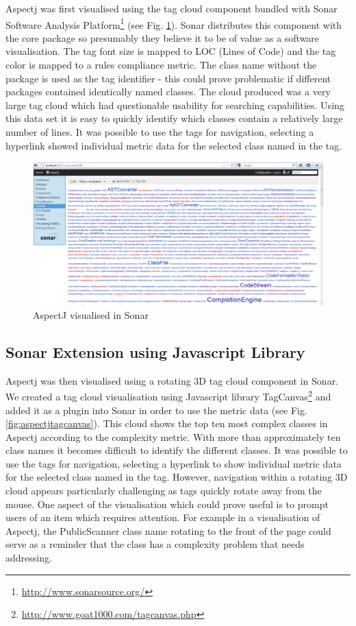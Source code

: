 Aspectj was first visualised using the tag cloud component bundled with Sonar Software Analysis Platform\footnote{\url{http://www.sonarsource.org/}} (see Fig. \ref{fig:aspectjsonar}). Sonar distributes this component with the core package so presumably they believe it to be of value as a software visualisation. The tag font size is mapped to LOC (Lines of Code) and the tag color is mapped to a rules compliance metric. The class name without the package is used as the tag identifier - this could prove problematic if different packages contained identically named classes. The cloud produced was a very large tag cloud which had questionable usability for searching capabilities. Using this data set it is easy to quickly identify which classes contain a relatively large number of lines. It was possible to use the tags for navigation, selecting a hyperlink showed individual metric data for the selected class named in the tag.

\begin{figure}[h!]
   \centering
   \includegraphics[width=140mm]{sonarcloud.png}
  \caption{AspectJ visualised in Sonar}
  \label{fig:aspectjsonar}
\end{figure}

\subsection{Sonar Extension using Javascript Library}

Aspectj was then visualised using a rotating 3D tag cloud component in Sonar. We created a tag cloud visualisation using Javascript library TagCanvas\footnote{\url{http://www.goat1000.com/tagcanvas.php}} and added it as a plugin into Sonar in order to use the metric data (see Fig. \ref{fig:aspectjtagcanvas}). This cloud shows the top ten most complex classes in Aspectj according to the complexity metric. With more than approximately ten class names it becomes difficult to identify the different classes. It was possible to use the tags for navigation, selecting a hyperlink to show individual metric data for the selected class named in the tag. However, navigation within a rotating 3D cloud appears particularly challenging as tags quickly rotate away from the mouse. One aspect of the visualisation which could prove useful is to prompt users of an item which requires attention. For example in a visualisation of Aspectj, the PublicScanner class name rotating to the front of the page could serve as a reminder that the class has a complexity problem that needs addressing.

